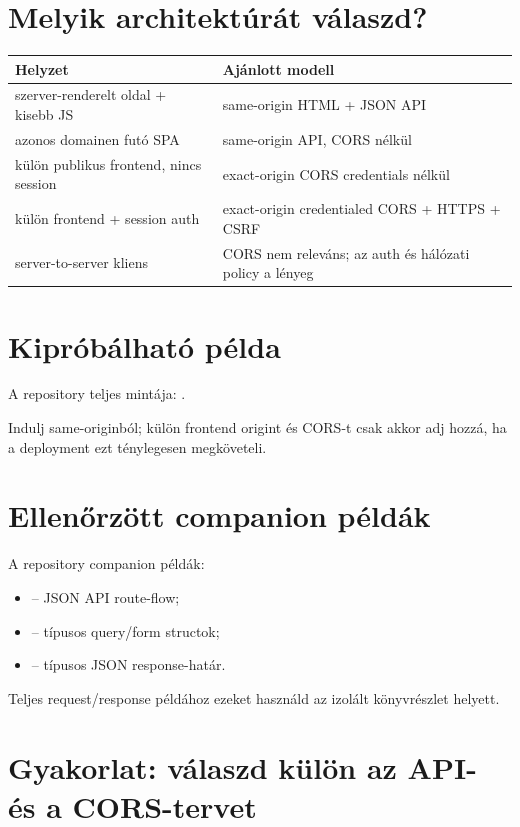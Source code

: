 \section{Melyik architektúrát válaszd?}

\begin{center}
\begin{tabularx}{\textwidth}{@{}L{0.27\textwidth}Y@{}}
\toprule
\textbf{Helyzet} & \textbf{Ajánlott modell} \\
\midrule
szerver-renderelt oldal + kisebb JS & same-origin HTML + JSON API \\
azonos domainen futó SPA & same-origin API, CORS nélkül \\
külön publikus frontend, nincs session & exact-origin CORS credentials nélkül \\
külön frontend + session auth & exact-origin credentialed CORS + HTTPS + CSRF \\
server-to-server kliens & CORS nem releváns; az auth és hálózati policy a lényeg \\
\bottomrule
\end{tabularx}
\end{center}

\section{Kipróbálható példa}

A repository teljes mintája: .

Indulj same-originból; külön frontend origint és CORS-t csak akkor adj hozzá, ha a deployment ezt ténylegesen megköveteli.

\section{Ellenőrzött companion példák}
A repository companion példák:
\begin{itemize}
  \item {} -- JSON API route-flow;
  \item {} -- típusos query/form structok;
  \item {} -- típusos JSON response-határ.
\end{itemize}
Teljes request/response példához ezeket használd az izolált könyvrészlet helyett.

\section{Gyakorlat: válaszd külön az API- és a CORS-tervet}
